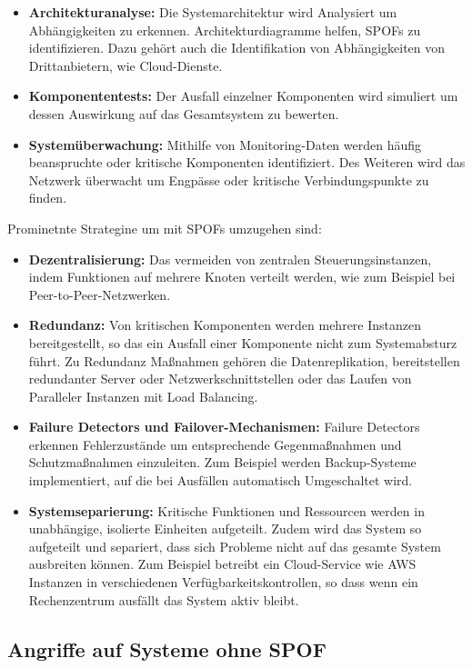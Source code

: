 \documentclass[a4paper,12pt]{article}
\begin{document}
\begin{itemize}
    \item \textbf{Architekturanalyse:} Die Systemarchitektur wird Analysiert um Abhängigkeiten zu erkennen. Architekturdiagramme helfen, SPOFs zu identifizieren. Dazu gehört auch die Identifikation von Abhängigkeiten von Drittanbietern, wie Cloud-Dienste.
    \item \textbf{Komponententests:} Der Ausfall einzelner Komponenten wird simuliert um dessen Auswirkung auf das Gesamtsystem zu bewerten.
    \item \textbf{Systemüberwachung:} Mithilfe von Monitoring-Daten werden häufig beanspruchte oder kritische Komponenten identifiziert. Des Weiteren wird das Netzwerk überwacht um Engpässe oder kritische Verbindungspunkte zu finden. 
\end{itemize}

Prominetnte Strategine um mit SPOFs umzugehen sind:

\begin{itemize}
    \item \textbf{Dezentralisierung:} Das vermeiden von zentralen Steuerungsinstanzen, indem Funktionen auf mehrere Knoten verteilt werden, wie zum Beispiel bei Peer-to-Peer-Netzwerken.
    \item \textbf{Redundanz:} Von kritischen Komponenten werden mehrere Instanzen bereitgestellt, so das ein Ausfall einer Komponente nicht zum Systemabsturz führt. Zu Redundanz Maßnahmen gehören die Datenreplikation, bereitstellen redundanter Server oder Netzwerkschnittstellen oder das Laufen von Paralleler Instanzen mit Load Balancing.
    \item \textbf{Failure Detectors und Failover-Mechanismen:} Failure Detectors erkennen Fehlerzustände um entsprechende Gegenmaßnahmen und Schutzmaßnahmen einzuleiten. Zum Beispiel werden Backup-Systeme implementiert, auf die bei Ausfällen automatisch Umgeschaltet wird.
    \item \textbf{Systemseparierung:} Kritische Funktionen und Ressourcen werden in unabhängige, isolierte Einheiten aufgeteilt. Zudem wird das System so aufgeteilt und separiert, dass sich Probleme nicht auf das gesamte System ausbreiten können. Zum Beispiel betreibt ein Cloud-Service wie AWS Instanzen in verschiedenen Verfügbarkeitskontrollen, so dass wenn ein Rechenzentrum ausfällt das System aktiv bleibt.
\end{itemize}

\subsection{Angriffe auf Systeme ohne SPOF}
\end{document}
